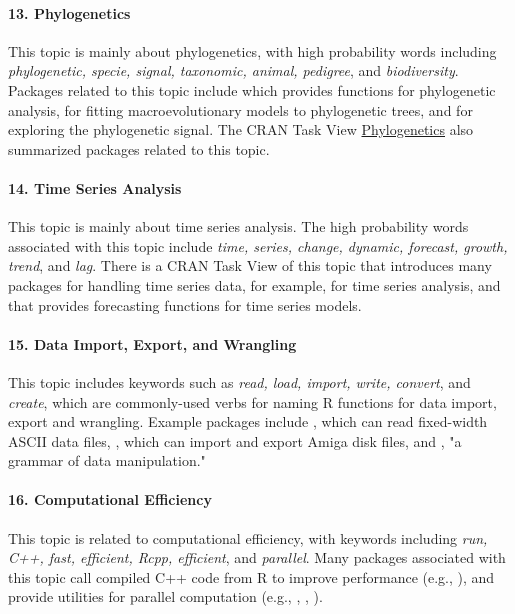\paragraph{13. Phylogenetics} This topic is mainly about phylogenetics, with high probability words including {\it phylogenetic, specie, signal, taxonomic, animal, pedigree}, and {\it biodiversity}. Packages related to this topic include  which provides functions for phylogenetic analysis,  for fitting macroevolutionary models to phylogenetic trees, and  for exploring the phylogenetic signal. The CRAN Task View \href{https://cran.r-project.org/web/views/Phylogenetics.html}{Phylogenetics} also summarized packages related to this topic.



\paragraph{14. Time Series Analysis} This topic is mainly about time series analysis. The high probability words associated with this topic include {\it time, series, change, dynamic, forecast, growth, trend}, and {\it lag}. There is a CRAN Task View of this topic that introduces many packages for handling time series data, for example,  for time series analysis, and  that provides forecasting functions for time series models.


\paragraph{15. Data Import, Export, and Wrangling}  This topic includes keywords such as {\it read, load, import, write, convert}, and {\it create}, which are commonly-used verbs for naming R functions for data import, export and wrangling. Example packages include , which can read fixed-width ASCII data files, , which can import and export Amiga disk files, and , "a grammar of data manipulation."

\paragraph{16. Computational Efficiency} This topic is related to computational efficiency, with keywords including {\it run, C++, fast, efficient, Rcpp, efficient}, and {\it parallel}. Many packages associated with this topic call compiled C++ code from R to improve performance (e.g., ), and provide utilities for parallel computation (e.g., , , ).

